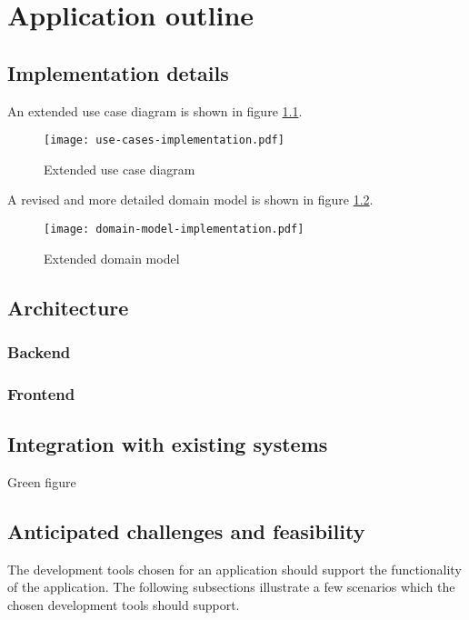 \chapter{Application outline}
\label{ch:outline}

\section{Implementation details}

An extended use case diagram is shown in figure \ref{fig:usecases2}.

\begin{figure}
    \centering
    \texttt{[image: use-cases-implementation.pdf]}
    \caption{Extended use case diagram}
    \label{fig:usecases2}
\end{figure}

A revised and more detailed domain model is shown in figure \ref{fig:domainmodel2}.

\begin{figure}
    \centering
    \texttt{[image: domain-model-implementation.pdf]}
    \caption{Extended domain model}
    \label{fig:domainmodel2}
\end{figure}

\section{Architecture}

\subsection{Backend}

\subsection{Frontend}

\section{Integration with existing systems}

Green figure

\section{Anticipated challenges and feasibility}

The development tools chosen for an application should support the functionality of the application. The following subsections illustrate a few scenarios which the chosen development tools should support.


